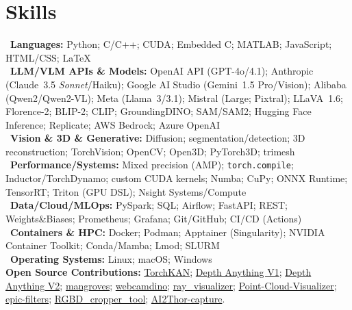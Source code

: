 \section*{Skills}

\textbullet~\textbf{Languages:} Python; C/C++; CUDA; Embedded C; MATLAB; JavaScript; HTML/CSS; \LaTeX\\
\textbullet~\textbf{LLM/VLM APIs \& Models:} OpenAI API (GPT\mbox{-}4o/4.1); Anthropic (Claude~3.5 \emph{Sonnet}/Haiku); Google AI Studio (Gemini~1.5 Pro/Vision); Alibaba (Qwen2/Qwen2\mbox{-}VL); Meta (Llama~3/3.1); Mistral (Large; Pixtral); LLaVA~1.6; Florence\mbox{-}2; BLIP\mbox{-}2; CLIP; GroundingDINO; SAM/SAM2; Hugging Face Inference; Replicate; AWS Bedrock; Azure OpenAI\\
\textbullet~\textbf{Vision \& 3D \& Generative:} Diffusion; segmentation/detection; 3D reconstruction; TorchVision; OpenCV; Open3D; PyTorch3D; trimesh\\
\textbullet~\textbf{Performance/Systems:} Mixed precision (AMP); \texttt{torch.compile}; Inductor/TorchDynamo; custom CUDA kernels; Numba; CuPy; ONNX Runtime; TensorRT; Triton (GPU DSL); Nsight Systems/Compute\\
\textbullet~\textbf{Data/Cloud/MLOps:} PySpark; SQL; Airflow; FastAPI; REST; Weights\&Biases; Prometheus; Grafana; Git/GitHub; CI/CD (Actions)\\
\textbullet~\textbf{Containers \& HPC:} Docker; Podman; Apptainer (Singularity); NVIDIA Container Toolkit; Conda/Mamba; Lmod; SLURM\\
\textbullet~\textbf{Operating Systems:} Linux; macOS; Windows\\[0.5em]

\textbf{Open Source Contributions:}
\href{https://github.com/1ssb/torchkan}{TorchKAN};
\href{https://github.com/LiheYoung/Depth-Anything}{Depth Anything V1};
\href{https://github.com/DepthAnything/Depth-Anything-V2}{Depth Anything V2};
\href{https://github.com/1ssb/mangroves}{mangroves};
\href{https://github.com/1ssb/webcamdino}{webcamdino};
\href{https://github.com/1ssb/ray_visualizer}{ray\_visualizer};
\href{https://github.com/1ssb/Point-Cloud-Visualizer}{Point\mbox{-}Cloud\mbox{-}Visualizer};
\href{https://github.com/1ssb/epic-filters}{epic\mbox{-}filters};
\href{https://github.com/1ssb/RGBD_cropper_tool}{RGBD\_cropper\_tool};
\href{https://github.com/1ssb/AI2Thor-capture}{AI2Thor\mbox{-}capture}.
